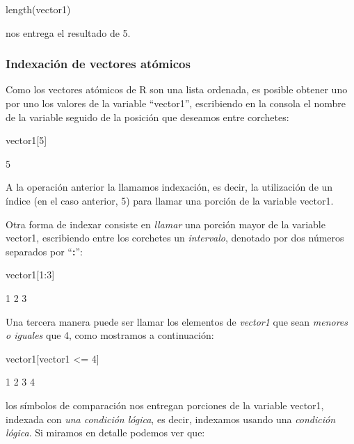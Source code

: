 \documentclass[11pt,a4paper]{article}
\begin{document}
\begin{Schunk}
\begin{Sinput}
length(vector1)
\end{Sinput}
\end{Schunk}
\noindent nos entrega el resultado de 5.

\subsubsection{Indexación de vectores atómicos}
Como los vectores atómicos de R son una lista ordenada, es posible obtener uno por uno los valores de la variable ``vector1'', escribiendo en la consola el nombre de la variable seguido de la posición que deseamos entre corchetes:
\begin{Schunk}
\begin{Sinput}
vector1[5]
\end{Sinput}
\begin{Soutput}
[1] 5
\end{Soutput}
\end{Schunk}

A la operación anterior la llamamos indexación, es decir, la utilización de un índice (en el caso anterior, 5) para llamar una porción de la variable vector1.

Otra forma de indexar consiste en \textit{llamar}  una porción mayor de la variable vector1, escribiendo entre los corchetes un \textit{intervalo}, denotado por dos números separados por ``\textbf{:}'':

\begin{Schunk}
\begin{Sinput}
vector1[1:3]
\end{Sinput}
\begin{Soutput}
[1] 1 2 3
\end{Soutput}
\end{Schunk}

Una tercera manera puede ser llamar los elementos de \textit{vector1} que sean \textit{menores o iguales} que 4, como mostramos a continuación:

\begin{Schunk}
\begin{Sinput}
vector1[vector1 <= 4]
\end{Sinput}
\begin{Soutput}
[1] 1 2 3 4
\end{Soutput}
\end{Schunk}

\noindent los símbolos de comparación nos entregan porciones de la variable vector1, indexada con \textit{una condición lógica}, es decir, indexamos usando una \textit{condición lógica}. Si miramos en detalle podemos ver que:
\end{document}
